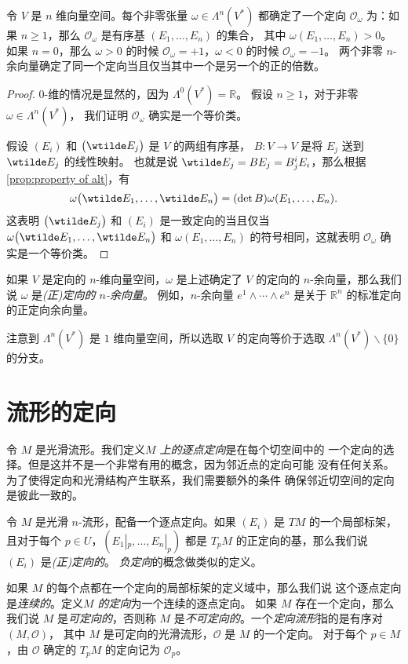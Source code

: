 \begin{proposition}
  令 $V$ 是 $n$ 维向量空间。每个非零张量 $\omega\in\Lambda^n(V^*)$
  都确定了一个定向 $\mathcal{O}_\omega$ 为：如果 $n\ge 1$，那么 
  $\mathcal{O}_\omega$ 是有序基 $(E_1,\dots,E_n)$ 的集合，
  其中 $\omega(E_1,\dots,E_n)>0$。如果 $n=0$，那么 $\omega>0$
  的时候 $\mathcal{O}_\omega=+1$，$\omega<0$ 的时候 $\mathcal{O}_\omega=-1$。
  两个非零 $n$-余向量确定了同一个定向当且仅当其中一个是另一个的正的倍数。 
\end{proposition}
\begin{proof}
  $0$-维的情况是显然的，因为 $\Lambda^0(V^*)=\mathbb{R}$。
  假设 $n\ge 1$，对于非零 $\omega\in \Lambda^n(V^*)$，
  我们证明 $\mathcal{O}_\omega$ 确实是一个等价类。

  假设 $(E_i)$ 和 $\bigl(\wtilde E_j\bigr)$ 是 $V$ 的两组有序基，
  $B:V\to V$ 是将 $E_j$ 送到 $\wtilde E_j$ 的线性映射。
  也就是说 $\wtilde E_j=BE_j=B^i_jE_i$，那么根据
  \autoref{prop:property of alt}，有
  \[
    \omega\bigl(\wtilde E_1,\dots,\wtilde E_n\bigr)  =
    (\det B)\omega(E_1,\dots,E_n).
  \]
  这表明 $\bigl(\wtilde E_j\bigr)$ 和 $(E_i)$ 是一致定向的当且仅当
  $\omega\bigl(\wtilde E_1,\dots,\wtilde E_n\bigr)$ 和 $\omega(E_1,\dots,E_n)$
  的符号相同，这就表明 $\mathcal{O}_\omega$ 确实是一个等价类。
\end{proof}

如果 $V$ 是定向的 $n$-维向量空间，$\omega$ 是上述确定了 $V$ 的定向的
$n$-余向量，那么我们说 $\omega$ 是\emph{(正)定向的 $n$-余向量}。
例如，$n$-余向量 $e^1\wedge\cdots\wedge e^n$ 是关于 $\mathbb{R}^n$
的标准定向的正定向余向量。

注意到 $\Lambda^n(V^*)$ 是 $1$ 维向量空间，所以选取 $V$ 的定向等价于选取
$\Lambda^n(V^*) \smallsetminus\{0\}$ 的分支。

\section{流形的定向}

令 $M$ 是光滑流形。我们定义\emph{$M$ 上的逐点定向}是在每个切空间中的
一个定向的选择。但是这并不是一个非常有用的概念，因为邻近点的定向可能
没有任何关系。为了使得定向和光滑结构产生联系，我们需要额外的条件
确保邻近切空间的定向是彼此一致的。

令 $M$ 是光滑 $n$-流形，配备一个逐点定向。如果 $(E_i)$ 是 $TM$
的一个局部标架，且对于每个 $p\in U$，$(E_1|_p,\dots,E_n|_p)$
都是 $T_pM$ 的正定向的基，那么我们说 $(E_i)$ 是\emph{(正)定向的}。
\emph{负定向}的概念做类似的定义。
 
如果 $M$ 的每个点都在一个定向的局部标架的定义域中，那么我们说
这个逐点定向是\emph{连续的}。定义\emph{$M$ 的定向}为一个连续的逐点定向。
如果 $M$ 存在一个定向，那么我们说 $M$ 是\emph{可定向的}，否则称
$M$ 是\emph{不可定向的}。一个\emph{定向流形}指的是有序对 $(M,\mathcal{O})$，
其中 $M$ 是可定向的光滑流形，$\mathcal{O}$ 是 $M$ 的一个定向。
对于每个 $p\in M$，由 $\mathcal{O}$ 确定的 $T_pM$ 的定向记为 $\mathcal{O}_p$。

